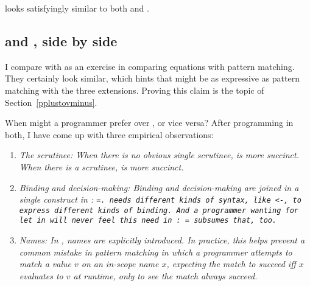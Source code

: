 \documentclass[manuscript,screen,review, 12pt, nonacm]{acmart}
\begin{document}
    \VMinus looks satisfyingly similar to both \PPlus and \VC. 
   
    \subsection{\VMinus and \PPlus, side by side}
    I compare \VMinus with \PPlus as an exercise in comparing equations with
    pattern matching. They certainly look similar, which hints that \VMinus
    might be as expressive as pattern matching with the three extensions. 
    Proving this claim is the topic of Section~\ref{pplustovminus}. 

    When might a programmer prefer \VMinus over \PPlus, or vice versa? After
    programming in both, I have come up with three empirical observations: 

    \begin{enumerate}
      \item \it{The scrutinee:} When there is no obvious single scrutinee, \VMinus is more succinct.
      When there is a scrutinee, \PPlus is more succinct. 
      \item \it{Binding and decision-making:} Binding and decision-making are
      joined in a single construct in \VMinus: \tt{=}. \PPlus needs different
      kinds of syntax, like \tt{<-}, to express different kinds of binding. And
      a programmer wanting for \tt{let} in \PPlus will never feel this need in
      \VMinus: \tt{=} subsumes that, too. 
      \item \it{Names:} In \VMinus, names are explicitly introduced. In
      practice, this helps prevent a common mistake in pattern matching in which
      a programmer attempts to match a value $v$ on an in-scope name $x$,
      expecting the match to succeed iff $x$ evaluates to $v$ at runtime, only
      to see the match always succeed. 
    \end{enumerate}     



\end{document}
